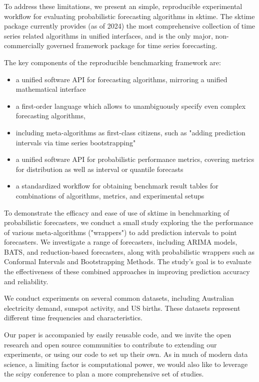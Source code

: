 To address these limitations, we present an simple, reproducible experimental workflow for evaluating probabilistic forecasting algorithms in sktime.
The sktime package currently provides (as of 2024) the most comprehensive collection of time series related algorithms in unified interfaces, and is the only major, non-commercially governed framework package for time series forecasting.

The key components of the reproducible benchmarking framework are:

\begin{itemize}
  \item a unified software API for forecasting algorithms, mirroring a unified mathematical interface
  \item a first-order language which allows to unambiguously specify even complex forecasting algorithms,
  \item including meta-algorithms as first-class citizens, such as "adding prediction intervals via time series bootstrapping"
  \item a unified software API for probabilistic performance metrics, covering metrics for distribution as well as interval or quantile forecasts
  \item a standardized workflow for obtaining benchmark result tables for combinations of algorithms, metrics, and experimental setups
\end{itemize}

To demonstrate the efficacy and ease of use of sktime in benchmarking of probabilistic forecasters, we conduct a small study exploring the the performance of various meta-algorithms ("wrappers") to add prediction intervals to point forecasters. We investigate a range of forecasters, including ARIMA models, BATS, and reduction-based forecasters, along with probabilistic wrappers such as Conformal Intervals and Bootstrapping Methods. The study's goal is to evaluate the effectiveness of these combined approaches in improving prediction accuracy and reliability.

We conduct experiments on several common datasets, including Australian electricity demand, sunspot activity, and US births. These datasets represent different time frequencies and characteristics.

Our paper is accompanied by easily reusable code, and we invite the open research and open source communities to contribute to extending our experiments, or using our code to set up their own. As in much of modern data science, a limiting factor is computational power, we would also like to leverage the scipy conference to plan a more comprehensive set of studies.

